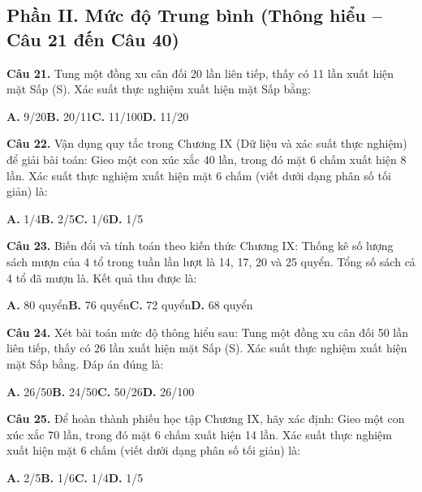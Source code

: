 \documentclass[11pt,a4paper]{article}
\begin{document}
\subsection*{\color{accent} Phần II. Mức độ Trung bình (Thông hiểu -- Câu 21 đến Câu 40)}
\textbf{\color{primary} Câu 21.} Tung một đồng xu cân đối 20 lần liên tiếp, thấy có 11 lần xuất hiện mặt Sấp (S). Xác suất thực nghiệm xuất hiện mặt Sấp bằng:\par
\hspace*{1.5em}\textbf{A.} 9/20\quad\quad \textbf{B.} 20/11\quad\quad \textbf{C.} 11/100\quad\quad \textbf{D.} 11/20\par\vspace{2pt}
\textbf{\color{primary} Câu 22.} Vận dụng quy tắc trong Chương IX (Dữ liệu và xác suất thực nghiệm) để giải bài toán: Gieo một con xúc xắc 40 lần, trong đó mặt 6 chấm xuất hiện 8 lần. Xác suất thực nghiệm xuất hiện mặt 6 chấm (viết dưới dạng phân số tối giản) là:\par
\hspace*{1.5em}\textbf{A.} 1/4\quad\quad \textbf{B.} 2/5\quad\quad \textbf{C.} 1/6\quad\quad \textbf{D.} 1/5\par\vspace{2pt}
\textbf{\color{primary} Câu 23.} Biến đổi và tính toán theo kiến thức Chương IX: Thống kê số lượng sách mượn của 4 tổ trong tuần lần lượt là 14, 17, 20 và 25 quyển. Tổng số sách cả 4 tổ đã mượn là. Kết quả thu được là:\par
\hspace*{1.5em}\textbf{A.} 80 quyển\quad\quad \textbf{B.} 76 quyển\quad\quad \textbf{C.} 72 quyển\quad\quad \textbf{D.} 68 quyển\par\vspace{2pt}
\textbf{\color{primary} Câu 24.} Xét bài toán mức độ thông hiểu sau: Tung một đồng xu cân đối 50 lần liên tiếp, thấy có 26 lần xuất hiện mặt Sấp (S). Xác suất thực nghiệm xuất hiện mặt Sấp bằng. Đáp án đúng là:\par
\hspace*{1.5em}\textbf{A.} 26/50\quad\quad \textbf{B.} 24/50\quad\quad \textbf{C.} 50/26\quad\quad \textbf{D.} 26/100\par\vspace{2pt}
\textbf{\color{primary} Câu 25.} Để hoàn thành phiếu học tập Chương IX, hãy xác định: Gieo một con xúc xắc 70 lần, trong đó mặt 6 chấm xuất hiện 14 lần. Xác suất thực nghiệm xuất hiện mặt 6 chấm (viết dưới dạng phân số tối giản) là:\par
\hspace*{1.5em}\textbf{A.} 2/5\quad\quad \textbf{B.} 1/6\quad\quad \textbf{C.} 1/4\quad\quad \textbf{D.} 1/5\par\vspace{2pt}
\end{document}
